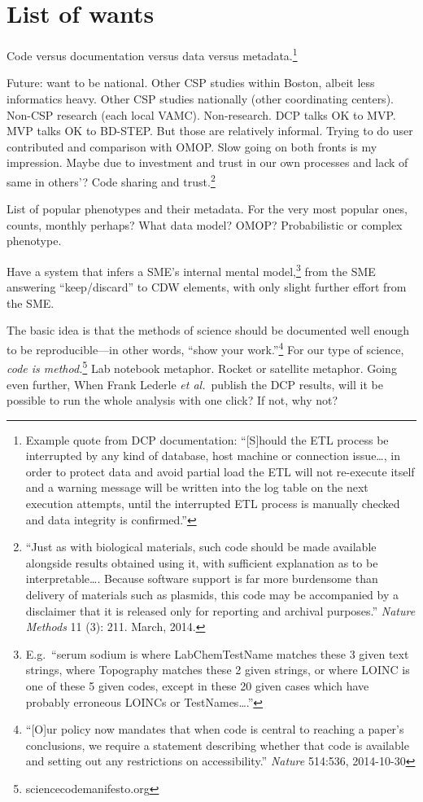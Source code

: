 \documentclass{tufte-handout}
\begin{document}
\section{List of wants}

Code versus documentation versus data versus
metadata.\footnote{Example quote from DCP documentation: ``[S]hould
  the ETL process be interrupted by any kind of database, host machine
  or connection issue\ldots{}, in order to protect data and avoid
  partial load the ETL will not re-execute itself and a warning
  message will be written into the log table on the next execution
  attempts, until the interrupted ETL process is manually checked and
  data integrity is confirmed.''}

Future: want to be national. Other CSP studies within Boston, albeit
less informatics heavy. Other CSP studies nationally (other
coordinating centers). Non-CSP research (each local VAMC).
Non-research. DCP talks OK to MVP. MVP talks OK to BD-STEP. But those
are relatively informal. Trying to do user contributed and comparison
with OMOP. Slow going on both fronts is my impression. Maybe due to
investment and trust in our own processes and lack of same in others'?
Code sharing and trust.\footnote{``Just as with biological materials,
  such code should be made available alongside results obtained using
  it, with sufficient explanation as to be interpretable\ldots{}.
  Because software support is far more burdensome than delivery of
  materials such as plasmids, this code may be accompanied by a
  disclaimer that it is released only for reporting and archival
  purposes.'' \emph{Nature Methods} 11 (3): 211. March, 2014.}


List of popular phenotypes and their metadata. For the very most
popular ones, counts, monthly perhaps? What data model? OMOP?
Probabilistic or complex phenotype.

Have a system that infers a SME's internal mental
model,\footnote{E.g.\ ``serum sodium is where LabChemTestName matches
  these 3 given text strings, where Topography matches these 2 given
  strings, or where LOINC is one of these 5 given codes, except in
  these 20 given cases which have probably erroneous LOINCs or
  TestNames\ldots{}.''} from the SME answering ``keep/discard'' to CDW
elements, with only slight further effort from the SME.

The basic idea is that the methods of science should be documented
well enough to be reproducible---in other words, ``show your
work.''\footnote{``[O]ur policy now mandates that when code is central
  to reaching a paper's conclusions, we require a statement describing
  whether that code is available and setting out any restrictions on
  accessibility.'' \emph{Nature} 514:536, 2014-10-30} For our type of
science, \emph{code is method.}\footnote{sciencecodemanifesto.org} Lab
notebook metaphor. Rocket or satellite metaphor. Going even further,
When Frank Lederle \emph{et al.}\ publish the DCP results, will it be
possible to run the whole analysis with one click? If not, why not?
\end{document}
